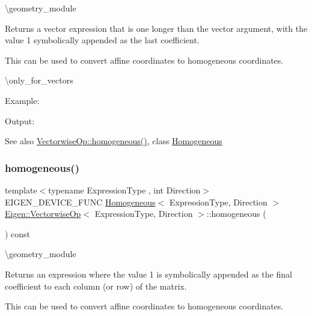 \textbackslash{}geometry\+\_\+module

\begin{DoxyReturn}{Returns}
a vector expression that is one longer than the vector argument, with the value 1 symbolically appended as the last coefficient.
\end{DoxyReturn}
This can be used to convert affine coordinates to homogeneous coordinates.

\textbackslash{}only\+\_\+for\+\_\+vectors

Example\+: 
\begin{DoxyCodeInclude}{0}
\end{DoxyCodeInclude}
 Output\+: 
\begin{DoxyVerbInclude}
\end{DoxyVerbInclude}


\begin{DoxySeeAlso}{See also}
\mbox{\hyperlink{group___geometry___module_ga7ae337c185a1de2343f12be4577c75fc}{Vectorwise\+Op\+::homogeneous()}}, class \mbox{\hyperlink{class_eigen_1_1_homogeneous}{Homogeneous}} 
\end{DoxySeeAlso}
\mbox{\label{group___geometry___module_ga7ae337c185a1de2343f12be4577c75fc}} 
\subsubsection{\texorpdfstring{homogeneous()}{homogeneous()}\hspace{0.1cm}{\footnotesize\ttfamily [2/2]}}
{\footnotesize\ttfamily template$<$typename Expression\+Type , int Direction$>$ \\
E\+I\+G\+E\+N\+\_\+\+D\+E\+V\+I\+C\+E\+\_\+\+F\+U\+NC \mbox{\hyperlink{class_eigen_1_1_homogeneous}{Homogeneous}}$<$ Expression\+Type, Direction $>$ \mbox{\hyperlink{class_eigen_1_1_vectorwise_op}{Eigen\+::\+Vectorwise\+Op}}$<$ Expression\+Type, Direction $>$\+::homogeneous (\begin{DoxyParamCaption}{ }\end{DoxyParamCaption}) const\hspace{0.3cm}{\ttfamily [inline]}}

\textbackslash{}geometry\+\_\+module

\begin{DoxyReturn}{Returns}
an expression where the value 1 is symbolically appended as the final coefficient to each column (or row) of the matrix.
\end{DoxyReturn}
This can be used to convert affine coordinates to homogeneous coordinates.

